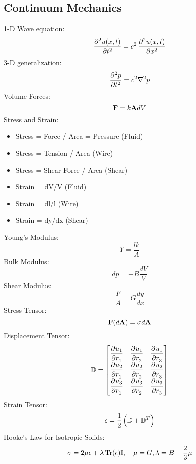 \documentclass[../PHYS306Notes.tex]{subfiles}
\begin{document}
\subsection{Continuum Mechanics}
1-D Wave equation:
\begin{equation}
    \dpd[2]{u(x, t)}{t} = c^2\dpd[2]{u(x, t)}{x}
\end{equation}
3-D generalization:
\begin{equation}
    \dpd[2]{p}{t} = c^2\nabla^2p
\end{equation}
Volume Forces:
\begin{equation}
    \mathbf{F} = k\mathbf{A}dV
\end{equation}
Stress and Strain:
\begin{itemize}
    \item Stress = Force / Area = Pressure (Fluid)
    \item Stress = Tension / Area (Wire)
    \item Stress = Shear Force / Area (Shear)
    \item Strain = dV/V (Fluid)
    \item Strain = dl/l (Wire)
    \item Strain = dy/dx (Shear)
\end{itemize}
Young's Modulus:
\begin{equation}
    Y = \frac{lk}{A}
\end{equation}
Bulk Modulus:
\begin{equation}
    dp = -B\frac{dV}{V}
\end{equation}
Shear Modulus:
\begin{equation}
    \frac{F}{A} = G\frac{dy}{dx}
\end{equation}
Stress Tensor:
\begin{equation}
    \mathbf{F}(d\mathbf{A}) = \sigma d\mathbf{A}
\end{equation}
Displacement Tensor:
\begin{equation}
    \mathbb{D} = \m{\dpd{u_1}{r_1} & \dpd{u_1}{r_2} & \dpd{u_1}{r_3} \\ \dpd{u_2}{r_1} & \dpd{u_2}{r_2} & \dpd{u_2}{r_3} \\
\dpd{u_3}{r_1} & \dpd{u_3}{r_2} & \dpd{u_3}{r_3}}
\end{equation}
Strain Tensor:
\begin{equation}
    \epsilon = \frac{1}{2}\left(\mathbb{D} + \mathbb{D}^T\right)
\end{equation}
Hooke's Law for Isotropic Solids:
\begin{equation}
    \sigma = 2\mu \epsilon + \lambda \Tr(\epsilon)\mathbb{I}, \quad \mu = G, \lambda = B - \frac{2}{3}\mu
\end{equation}
\end{document}
